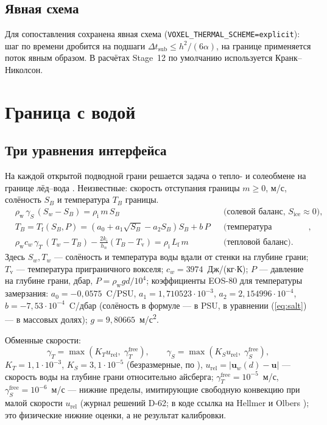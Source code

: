 \documentclass[12pt,a4paper]{article}
\newcommand{\Lf}{L_{\mathrm f}}
\newcommand{\rhoi}{\rho_{\mathrm i}}
\newcommand{\rhow}{\rho_{\mathrm w}}
\newcommand{\ki}{k_{\mathrm i}}
\newcommand{\Tf}{T_{\mathrm f}}
\newcommand{\code}[1]{\texttt{\small #1}}
\begin{document}
\subsection{Явная схема}
Для сопоставления сохранена явная схема (\code{VOXEL\_THERMAL\_SCHEME=explicit}): шаг по времени дробится на подшаги $\Delta t_{\mathrm{sub}}\le h^2/(6\alpha)$, на границе применяется поток явным образом. В расчётах Stage~12 по умолчанию используется Кранк--Николсон.

\section{Граница с водой}\label{sec:3eq}

\subsection{Три уравнения интерфейса}
На каждой открытой подводной грани решается задача о тепло- и солеобмене на границе лёд--вода \cite{hollandjenkins1999,jenkins2010}. Неизвестные: скорость отступания границы $m\ge0$, м/с, солёность $S_B$ и температура $T_B$ границы.
\begin{align}
&\rhow\,\gamma_S\,(S_w-S_B)=\rhoi\,m\,S_B &&\text{(солевой баланс, } S_{\mathrm{ice}}\approx0),\label{eq:salt}\\
&T_B=\Tf(S_B,P)=\left(a_0+a_1\sqrt{S_B}-a_2S_B\right)S_B+b\,P &&\text{(температура замерзания)},\label{eq:tf}\\
&\rhow c_w\,\gamma_T\,(T_w-T_B)-\frac{2\ki}{h_n}\left(T_B-T_{\mathrm v}\right)=\rhoi\,\Lf\,m &&\text{(тепловой баланс)}.\label{eq:heat}
\end{align}
Здесь $S_w,T_w$ --- солёность и температура воды вдали от стенки на глубине грани; $T_{\mathrm v}$ --- температура приграничного вокселя; $c_w=3974$~Дж/(кг$\cdot$К); $P$ --- давление на глубине грани, дбар, $P=\rhow gd/10^4$; коэффициенты EOS-80 для температуры замерзания: $a_0=-0{,}0575$~\textdegree C/PSU, $a_1=1{,}710523\cdot10^{-3}$, $a_2=2{,}154996\cdot10^{-4}$, $b=-7{,}53\cdot10^{-4}$~\textdegree C/дбар (солёность в формуле --- в PSU, в уравнении (\ref{eq:salt}) --- в массовых долях); $g=9{,}80665$~м/с\textsuperscript2.

Обменные скорости:
\begin{equation}
\gamma_T=\max\!\left(K_T u_{\mathrm{rel}},\;\gamma_T^{\mathrm{free}}\right),\qquad
\gamma_S=\max\!\left(K_S u_{\mathrm{rel}},\;\gamma_S^{\mathrm{free}}\right),
\end{equation}
$K_T=1{,}1\cdot10^{-3}$, $K_S=3{,}1\cdot10^{-5}$ (безразмерные, по \cite{jenkins2010}), $u_{\mathrm{rel}}=|\mathbf u_w(d)-\mathbf u|$ --- скорость воды на глубине грани относительно айсберга; $\gamma_T^{\mathrm{free}}=10^{-5}$~м/с, $\gamma_S^{\mathrm{free}}=10^{-6}$~м/с --- нижние пределы, имитирующие свободную конвекцию при малой скорости $u_{\mathrm{rel}}$ (журнал решений D-62; в коде ссылка на Hellmer и Olbers \cite{hellmer1989}); это физические нижние оценки, а не результат калибровки.
\end{document}
